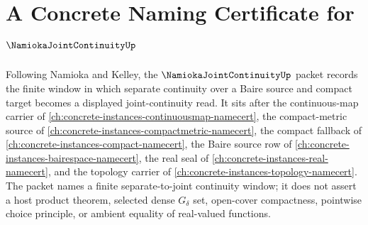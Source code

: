 \chapter{A Concrete Naming Certificate for $\NamiokaJointContinuityUp$}
\label{ch:concrete-instances-namioka-joint-continuity-namecert}

Following Namioka and Kelley, the $\NamiokaJointContinuityUp$ packet records the finite window in which separate continuity over a Baire source and compact target becomes a displayed joint-continuity read. It sits after the continuous-map carrier of \autoref{ch:concrete-instances-continuousmap-namecert}, the compact-metric source of \autoref{ch:concrete-instances-compactmetric-namecert}, the compact fallback of \autoref{ch:concrete-instances-compact-namecert}, the Baire source row of \autoref{ch:concrete-instances-bairespace-namecert}, the real seal of \autoref{ch:concrete-instances-real-namecert}, and the topology carrier of \autoref{ch:concrete-instances-topology-namecert}. The packet names a finite separate-to-joint continuity window; it does not assert a host product theorem, selected dense $G_\delta$ set, open-cover compactness, pointwise choice principle, or ambient equality of real-valued functions.

